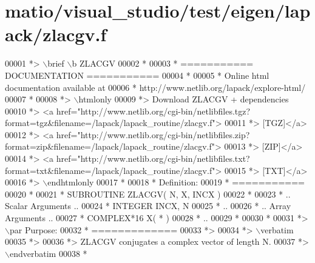 \hypertarget{matio_2visual__studio_2test_2eigen_2lapack_2zlacgv_8f_source}{}\section{matio/visual\+\_\+studio/test/eigen/lapack/zlacgv.f}
\label{matio_2visual__studio_2test_2eigen_2lapack_2zlacgv_8f_source}

\begin{DoxyCode}
00001 \textcolor{comment}{*> \(\backslash\)brief \(\backslash\)b ZLACGV}
00002 \textcolor{comment}{*}
00003 \textcolor{comment}{*  =========== DOCUMENTATION ===========}
00004 \textcolor{comment}{*}
00005 \textcolor{comment}{* Online html documentation available at }
00006 \textcolor{comment}{*            http://www.netlib.org/lapack/explore-html/ }
00007 \textcolor{comment}{*}
00008 \textcolor{comment}{*> \(\backslash\)htmlonly}
00009 \textcolor{comment}{*> Download ZLACGV + dependencies }
00010 \textcolor{comment}{*> <a
       href="http://www.netlib.org/cgi-bin/netlibfiles.tgz?format=tgz&filename=/lapack/lapack\_routine/zlacgv.f"> }
00011 \textcolor{comment}{*> [TGZ]</a> }
00012 \textcolor{comment}{*> <a
       href="http://www.netlib.org/cgi-bin/netlibfiles.zip?format=zip&filename=/lapack/lapack\_routine/zlacgv.f"> }
00013 \textcolor{comment}{*> [ZIP]</a> }
00014 \textcolor{comment}{*> <a
       href="http://www.netlib.org/cgi-bin/netlibfiles.txt?format=txt&filename=/lapack/lapack\_routine/zlacgv.f"> }
00015 \textcolor{comment}{*> [TXT]</a>}
00016 \textcolor{comment}{*> \(\backslash\)endhtmlonly }
00017 \textcolor{comment}{*}
00018 \textcolor{comment}{*  Definition:}
00019 \textcolor{comment}{*  ===========}
00020 \textcolor{comment}{*}
00021 \textcolor{comment}{*       SUBROUTINE ZLACGV( N, X, INCX )}
00022 \textcolor{comment}{* }
00023 \textcolor{comment}{*       .. Scalar Arguments ..}
00024 \textcolor{comment}{*       INTEGER            INCX, N}
00025 \textcolor{comment}{*       ..}
00026 \textcolor{comment}{*       .. Array Arguments ..}
00027 \textcolor{comment}{*       COMPLEX*16         X( * )}
00028 \textcolor{comment}{*       ..}
00029 \textcolor{comment}{*  }
00030 \textcolor{comment}{*}
00031 \textcolor{comment}{*> \(\backslash\)par Purpose:}
00032 \textcolor{comment}{*  =============}
00033 \textcolor{comment}{*>}
00034 \textcolor{comment}{*> \(\backslash\)verbatim}
00035 \textcolor{comment}{*>}
00036 \textcolor{comment}{*> ZLACGV conjugates a complex vector of length N.}
00037 \textcolor{comment}{*> \(\backslash\)endverbatim}
00038 \textcolor{comment}{*}

\end{DoxyCode}
